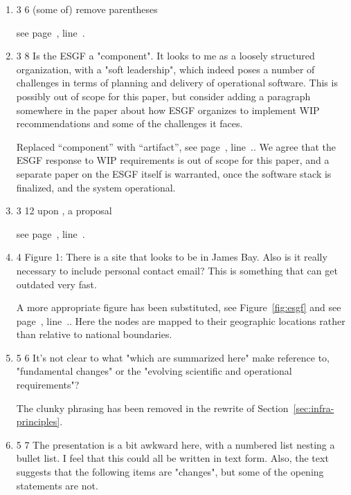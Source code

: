 \documentclass[gmd,manuscript]{copernicus}
\newcommand{\plref}[1]{see page~\pageref{p-#1}, line~\lineref{l-#1}.}
\newenvironment{answer}{\color{blue}}{}
\begin{document}
\begin{enumerate}[label=RC2-\arabic*,leftmargin=*]
  \begin{answer}
    \plref{RC2-8}
  \end{answer}
\item 3 6 (some of) remove parentheses

  \begin{answer}
    \plref{RC2-12}
  \end{answer}
\item 3 8 Is the ESGF a "component". It looks to me as a loosely
  structured organization, with a "soft leadership", which indeed
  poses a number of challenges in terms of planning and delivery of
  operational software. This is possibly out of scope for this paper,
  but consider adding a paragraph somewhere in the paper about how
  ESGF organizes to implement WIP recommendations and some of the
  challenges it faces.

  \begin{answer}
    Replaced ``component'' with ``artifact'', \plref{RC2-10}. We agree
    that the ESGF response to WIP requirements is out of scope for
    this paper, and a separate paper on the ESGF itself is warranted,
    once the software stack is finalized, and the system operational.
  \end{answer}
\item 3 12 upon , a proposal

  \begin{answer}
    \plref{RC2-11}
  \end{answer}
\item 4 Figure 1: There is a site that looks to be in James Bay. Also
  is it really necessary to include personal contact email? This is
  something that can get outdated very fast.

  \begin{answer}
    A more appropriate figure has been substituted, see
    Figure~\ref{fig:esgf} and \plref{RC2-12}. Here the nodes are
    mapped to their geographic locations rather than relative to
    national boundaries.
  \end{answer}
\item 5 6 It’s not clear to what "which are summarized here" make
  reference to, "fundamental changes" or the "evolving scientific and
  operational requirements"?

  \begin{answer}
    The clunky phrasing has been removed in the rewrite of
    Section~\ref{sec:infra-principles}.
  \end{answer}
\item 5 7 The presentation is a bit awkward here, with a numbered list
  nesting a bullet list. I feel that this could all be written in text
  form. Also, the text suggests that the following items are
  "changes", but some of the opening statements are not.


\end{enumerate}
\end{document}
